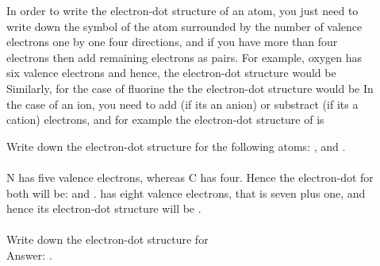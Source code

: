 \documentclass[main.tex]{subfiles}
\begin{document}
\begin{description}
\item[] In order to write the electron-dot structure of an atom, you just need to write down the symbol of the atom surrounded by the number of valence electrons one by one four directions, and if you have more than four electrons then add remaining electrons as pairs. For example, oxygen has six valence electrons and hence, the electron-dot structure would be \hspace{.05in}\hspace{.05in} Similarly, for the case of fluorine the  the electron-dot structure would be  \hspace{.05in} \hspace{.05in} In the case of an ion, you need to add (if its an anion) or substract (if its a cation) electrons, and for example the electron-dot structure of  is \hspace{.05in}\hspace{.05in}
\begin{example} %
Write down the electron-dot structure for the following atoms: ,  and .\\
\\
N has five valence electrons, whereas C has four. Hence the electron-dot for both will be: \hspace{.05in}\hspace{.05in} and  \hspace{.05in}\hspace{.05in}.  has eight valence electrons, that is seven plus one, and hence its electron-dot structure will be \hspace{.05in}\hspace{.05in}\ce{^{-}}. \\
\faDiamond\ \\
Write down the electron-dot structure for \\
\flushright Answer: \hspace{.05in}\hspace{.05in}.
\end{example}%



\end{description}
\end{document}
